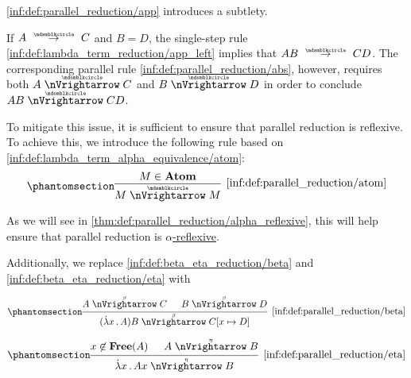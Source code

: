 \begin{definition}
\begin{thmenum}
     \ref{inf:def:parallel_reduction/app} introduces a subtlety.

    If \( A \pred C \) and \( B = D \), the single-step rule \ref{inf:def:lambda_term_reduction/app_left} implies that \( AB \pred CD \). The corresponding parallel rule \ref{inf:def:parallel_reduction/abs}, however, requires both \( A \ppred C \) and \( B \ppred D \) in order to conclude \( AB \ppred CD \).

    To mitigate this issue, it is sufficient to ensure that parallel reduction is reflexive. To achieve this, we introduce the following rule based on \ref{inf:def:lambda_term_alpha_equivalence/atom}:
    \begin{equation*}\taglabel[\ensuremath{ \logic{ParAtom}_{\Anon} }]{inf:def:parallel_reduction/atom}
      \begin{prooftree}
        \hypo{ M \in \op*{Atom} }
        \infer1[\ref{inf:def:parallel_reduction/atom}]{ M \ppred M }
      \end{prooftree}
    \end{equation*}

    As we will see in \cref{thm:def:parallel_reduction/alpha_reflexive}, this will help ensure that parallel reduction is \hyperref[def:alpha_reflexive]{\( \alpha \)-reflexive}.
  \end{thmenum}

   Additionally, we replace \ref{inf:def:beta_eta_reduction/beta} and \ref{inf:def:beta_eta_reduction/eta} with
  \begin{paracol}{2}
    \begin{leftcolumn}
      \ParacolAlignmentHack
      \begin{equation*}\taglabel[\ensuremath{ \logic{ParRed}_\beta }]{inf:def:parallel_reduction/beta}
        \begin{prooftree}
          \hypo{ A \pbred C }
          \hypo{ B \pbred D }
          \infer2[\ref{inf:def:parallel_reduction/beta}]{ (\qabs x A) B \pbred C[x \mapsto D] }.
        \end{prooftree}
      \end{equation*}
    \end{leftcolumn}

    \begin{rightcolumn}
      \ParacolAlignmentHack
      \begin{equation*}\taglabel[\ensuremath{ \logic{ParRed}_\eta }]{inf:def:parallel_reduction/eta}
        \begin{prooftree}
          \hypo{ x \not\in \op*{Free}(A) }
          \hypo{ A \pered B }
          \infer2[\ref{inf:def:parallel_reduction/eta}]{ \qabs x A x \pered B }.
        \end{prooftree}
      \end{equation*}
    \end{rightcolumn}
  \end{paracol}


\end{definition}
